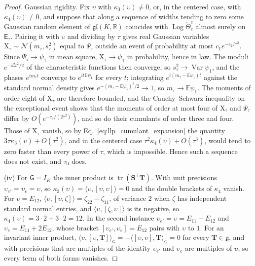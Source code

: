 \begin{proof}
Gaussian rigidity. Fix $\upsilon$ with $\kappa_3(\upsilon)\neq0$, or, in the centered case, with $\kappa_4(\upsilon)\neq0$, and suppose that along a sequence of widths tending to zero some Gaussian random element of $\mathfrak{gl}(K,\mathbb R)$ coincides with $\operatorname{Log}\mathring\Theta^c_e$ almost surely on $\mathsf E_\tau$. Pairing it with $\upsilon$ and dividing by $\tau$ gives real Gaussian variables $\mathrm X_\tau\sim\mathcal N(m_\tau,s_\tau^2)$ equal to $\Psi_\tau$ outside an event of probability at most $c_1e^{-c_2/\tau^2}$. Since $\Psi_\tau\to\psi_1$ in mean square, $\mathrm X_\tau\to\psi_1$ in probability, hence in law. The moduli $e^{-s_\tau^2t^2/2}$ of the characteristic functions then converge, so $s_\tau^2\to\operatorname{Var}\psi_1$, and the phases $e^{im_\tau t}$ converge to $e^{it\mathbb E\psi_1}$ for every $t$; integrating $e^{i(m_\tau-\mathbb E\psi_1)t}$ against the standard normal density gives $e^{-(m_\tau-\mathbb E\psi_1)^2/2}\to1$, so $m_\tau\to\mathbb E\psi_1$. The moments of order eight of $\mathrm X_\tau$ are therefore bounded, and the Cauchy--Schwarz inequality on the exceptional event shows that the moments of order at most four of $\mathrm X_\tau$ and $\Psi_\tau$ differ by $O(e^{-c_2/(2\tau^2)})$, and so do their cumulants of order three and four. Those of $\mathrm X_\tau$ vanish, so by Eq.~\eqref{eq:llp_cumulant_expansion} the quantity $3\tau\kappa_3(\upsilon)+O(\tau^2)$, and in the centered case $\tau^2\kappa_4(\upsilon)+O(\tau^3)$, would tend to zero faster than every power of $\tau$, which is impossible. Hence such a sequence does not exist, and $\tau_0$ does.

(iv) For $\mathsf G=I_K$ the inner product is $\operatorname{tr}(\mathbf S^\top\mathbf T)$. With unit precisions $\upsilon_{e'}=\upsilon_e=\upsilon$, so $\kappa_3(\upsilon)=\langle\upsilon,[\upsilon,\upsilon]\rangle=0$ and the double brackets of $\kappa_4$ vanish. For $\upsilon=E_{12}$, $\langle\upsilon,[\upsilon,\zeta]\rangle=\zeta_{22}-\zeta_{11}$, of variance $2$ when $\zeta$ has independent standard normal entries, and $\langle\upsilon,[\zeta,\upsilon]\rangle$ is its negative, so $\kappa_4(\upsilon)=3\cdot2+3\cdot2=12$. In the second instance $\upsilon_{e'}=\upsilon=E_{11}+E_{12}$ and $\upsilon_e=E_{11}+2E_{12}$, whose bracket $[\upsilon_{e'},\upsilon_e]=E_{12}$ pairs with $\upsilon$ to $1$. For an invariant inner product, $\langle\upsilon,[\upsilon,\mathbf T]\rangle_{\mathsf G}=-\langle[\upsilon,\upsilon],\mathbf T\rangle_{\mathsf G}=0$ for every $\mathbf T\in\mathfrak g$, and with precisions that are multiples of the identity $\upsilon_{e'}$ and $\upsilon_e$ are multiples of $\upsilon$, so every term of both forms vanishes.
\end{proof}

